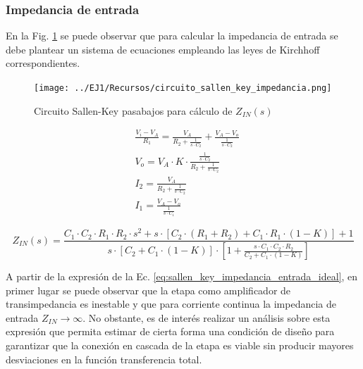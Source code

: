 \subsubsection{Impedancia de entrada}
En la Fig. \ref{fig:circuito_sallen_key_impedancia_entrada_ideal} se puede observar que para calcular la impedancia de entrada se debe plantear un sistema de ecuaciones empleando 
las leyes de Kirchhoff correspondientes.

\begin{figure}[H]
    \centering
    \texttt{[image: ../EJ1/Recursos/circuito\_sallen\_key\_impedancia.png]}
    \caption{Circuito Sallen-Key pasabajos para c\'alculo de $Z_{IN}(s)$}
    \label{fig:circuito_sallen_key_impedancia_entrada_ideal}
\end{figure}

\begin{align*}
    & \frac{V_i - V_A}{R_1} = \frac{V_A}{R_2 + \frac{1}{s \cdot C_2}} + \frac{V_A - V_o}{\frac{1}{s \cdot C_2}} \\
    & V_o = V_A \cdot K \cdot \frac{\frac{1}{s \cdot C_2}}{R_2 + \frac{1}{s \cdot C_2}} \\
    & I_2 = \frac{V_A}{R_2 + \frac{1}{s \cdot C_2}} \\
    & I_1 = \frac{V_A - V_o}{\frac{1}{s \cdot C_1}}
\end{align*}

\begin{equation}
    Z_{IN}(s) = \frac{C_1 \cdot C_2 \cdot R_1 \cdot R_2 \cdot s^{2} + s \cdot \left[ C_2 \cdot (R_1 + R_2) + C_1 \cdot R_1 \cdot (1 - K) \right] + 1}{s \cdot \left[C_2 + C_1 \cdot (1 - K) \right] \cdot \left[ 1 + \frac{s \cdot C_1 \cdot C_2 \cdot R_2}{C_2 + C_1 \cdot (1 - K)} \right]}
    \label{eq:sallen_key_impedancia_entrada_ideal}
\end{equation}

A partir de la expresi\'on de la Ec. \ref{eq:sallen_key_impedancia_entrada_ideal}, en primer lugar se puede observar que la etapa como amplificador de transimpedancia es inestable y que para corriente continua la impedancia de entrada $Z_{IN} \rightarrow \infty$.
No obstante, es de inter\'es realizar un an\'alisis sobre esta expresi\'on que permita estimar de cierta forma una condici\'on de dise\~no para garantizar que la conexi\'on en cascada de la etapa es viable sin producir mayores desviaciones en la funci\'on transferencia total.



